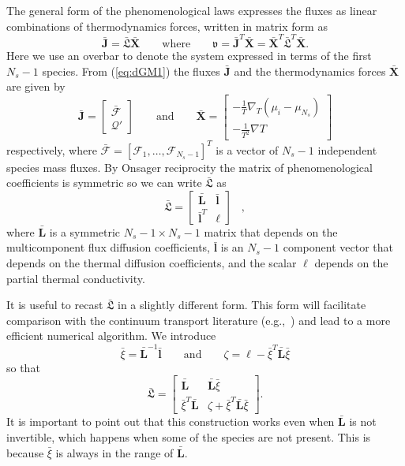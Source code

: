 \documentclass[11pt]{article}
\newcommand{\HeatFlux}{\boldsymbol{\mathcal{Q}}}
\newcommand{\SpeciesFlux}{\boldsymbol{\mathcal{F}}}
\newcommand{\SpeciesFluxB}{\bar{\boldsymbol{\mathcal{F}}}}
\newcommand{\EntropyProduction}{\mathfrak{v}}
\newcommand{\OnsagerMatrixB}{\bar{\boldsymbol{\mathfrak{L}}}}
\newcommand{\Jbar}{\bar{\mathbf{J}}}
\newcommand{\Xbar}{\bar{\mathbf{X}}}
\newcommand{\Lbar}{\bar{\mathbf{L}}}
\newcommand{\lbar}{\bar{\mathbf{l}}}
\newcommand{\xibar}{\bar{\xi}}
\begin{document}
The general form of the phenomenological laws
expresses the fluxes as linear combinations of thermodynamics forces, written in matrix form as
\[
\Jbar = \OnsagerMatrixB \Xbar
\qquad\mathrm{where}\qquad
\EntropyProduction = \Jbar^T \Xbar =  \Xbar^T \OnsagerMatrixB^T \Xbar.
\]
Here we use an overbar to denote the system expressed in terms of the first $N_s-1$ species.
From (\ref{eq:dGM1}) the fluxes $\Jbar$ and the thermodynamics forces $\Xbar$ are given by
\[
\Jbar =
\begin{bmatrix} \SpeciesFluxB \\ \HeatFlux'
\end{bmatrix}
\qquad \mathrm{and} \qquad
\Xbar = \begin{bmatrix}
- \frac{1}{T} \nabla_T ( \mu_i - \mu_{N_s})
\\
- \frac{1}{T^{2}}\nabla T
\end{bmatrix}
\]
respectively,  where $\SpeciesFluxB = [\SpeciesFlux_1,\ldots,\SpeciesFlux_{N_s-1}]^T$ is a vector of $N_s-1$ independent species mass fluxes.
By Onsager reciprocity the matrix of phenomenological coefficients is symmetric so we can write $\OnsagerMatrixB$ as
\[
\OnsagerMatrixB =
\begin{bmatrix}
{\Lbar} & \lbar
\\
{\lbar}^T & \ell
\end{bmatrix}  \;\;\;  ,
\]
where $\Lbar$ is a symmetric $N_s-1 \times N_s-1$ matrix that depends on the multicomponent flux diffusion coefficients, $\lbar$ is an $N_s-1$ component
vector that depends on the thermal diffusion coefficients, and the scalar $\ell$ depends on the
partial thermal conductivity.

It is useful to recast $\OnsagerMatrixB$ in a slightly different form.
This form will facilitate comparison with the continuum transport literature (e.g.,~\cite{Giovangigli_99})  and lead
to a more efficient numerical algorithm.
We introduce
\[
\xibar = \Lbar^{-1} \lbar
\qquad \mathrm{and} \qquad
\zeta = \ell - \xibar^T \Lbar \xibar
\]
so that
\begin{equation}
{\OnsagerMatrixB} =
\begin{bmatrix}
{\Lbar} & {\Lbar \xibar}
\\
{\xibar^T{\Lbar}} & \zeta + \xibar^T {\Lbar} \xibar
\end{bmatrix}.
\label{eq:Lbar_xi}
\end{equation}
It is important to point out that this construction works even when $\Lbar$ is not invertible,
which happens when some of the species are not present. This is because $\xibar$ is always in the range of $\Lbar$.
\end{document}

